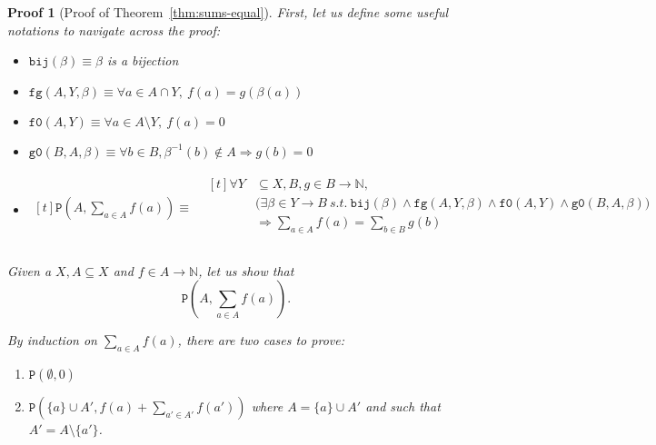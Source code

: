 \documentclass[pdflatex,sn-mathphys]{sn-jnl}%
\theoremstyle{thmstyleone}%
\theoremstyle{thmstyletwo}%
\newtheorem*{pf}{Proof}%
\theoremstyle{thmstylethree}%
\begin{document}
    \begin{pf}[Proof of Theorem~\ref{thm:sums-equal}]

      First, let us define some useful notations to navigate across
      the proof:

      \begin{itemize}
      \item $\mathtt{bij}(\beta)\equiv\beta$ is a bijection
      \item
        $\mathtt{fg}(A,Y,\beta)\equiv\forall{}a\in{}A\cap{}Y,~f(a)=g(\beta(a))$
      \item $\mathtt{f0}(A,Y)\equiv\forall{}a\in{}A\setminus{}Y,~f(a)=0$
      \item
        $\mathtt{g0}(B,A,\beta)\equiv\forall{}b\in{}B,\beta^{-1}(b)\notin{}A\Rightarrow{}g(b)=0$
      \item $\begin{aligned}[t]
               \mathtt{P}(A,\sum\limits_{a\in{}A}f(a))\equiv{}& \begin{aligned}[t]
                                                                  \forall{}Y&\subseteq{}X,B,g\in{}B\rightarrow{}\mathbb{N}, \\
                                                                            & \big(\exists{}\beta\in{}Y\rightarrow{}B~s.t.~\mathtt{bij}(\beta)\land\mathtt{fg}(A,Y,\beta)\land\mathtt{f0}(A,Y)\land\mathtt{g0}(B,A,\beta)\big) \\
                                                                            & \Rightarrow{}\sum\limits_{a\in{}A}f(a)=\sum\limits_{b\in{}B}g(b)\\
                                                                \end{aligned} \\
             \end{aligned}$
      \end{itemize}

      Given a $X, A\subseteq{}X$ and $f\in{}A\rightarrow{}\mathbb{N}$,
      let us show that
      \begin{equation*}
        \boxed{\mathtt{P}(A,\sum\limits_{a\in{}A}f(a)).}
      \end{equation*}

      By induction on $\sum\limits_{a\in{}A}f(a)$, there are two cases
      to prove:
      \begin{enumerate}
      \item $\boxed{\mathtt{P}(\emptyset,0)}$
      \item
        $\boxed{\mathtt{P}(\{a\}\cup{}A',f(a)+\sum_{a'\in{}A'}f(a'))}$
        where $A=\{a\}\cup{}A'$ and such that $A'=A\setminus{}\{a'\}$.
      \end{enumerate}


\end{pf}
\end{document}
